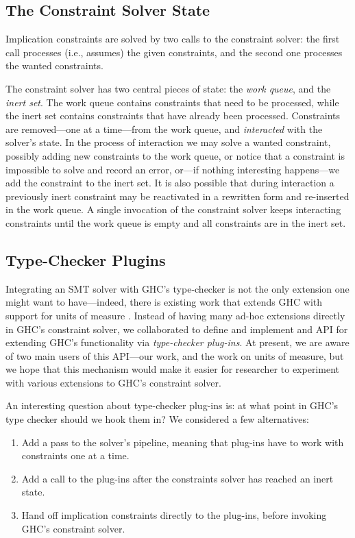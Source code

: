\documentclass{sigplanconf}
\begin{document}
\subsection{The Constraint Solver State}
Implication constraints are solved by two calls to the constraint solver:
the first call processes (i.e., assumes) the given constraints, and the
second one processes the wanted constraints.

The constraint solver has two central pieces of state: the {\em work queue},
and the {\em inert set}.  The work queue contains constraints that need to be
processed, while the inert set contains constraints that have already
been processed.  Constraints are removed---one at a time---from the work queue,
and {\em interacted} with the solver's state.  In the process of interaction
we may solve a wanted constraint, possibly adding new constraints to the
work queue, or notice that a constraint is impossible to solve and record
an error, or---if nothing interesting happens---we add the constraint
to the inert set.  It is also possible that during interaction a previously
inert constraint may be reactivated in a rewritten form and re-inserted
in the work queue.  A single invocation of the constraint solver keeps
interacting constraints until the work queue is empty and all constraints
are in the inert set.

\subsection{Type-Checker Plugins}
Integrating an SMT solver with GHC's type-checker is not the only extension
one might want to have---indeed, there is existing work that extends GHC
with support for units of measure \cite{units-of-measure}.  Instead of
having many ad-hoc extensions directly in GHC's constraint solver, we
collaborated to define and implement and API for extending GHC's functionality
via {\em type-checker plug-ins}.  At present, we are aware of two main
users of this API---our work, and the work on units of measure, but we
hope that this mechanism would make it easier for researcher to experiment
with various extensions to GHC's constraint solver.

An interesting question about type-checker plug-ins is: at what point in
GHC's type checker should we hook them in? We considered a few alternatives:
\begin{enumerate}
\item Add a pass to the solver's pipeline, meaning that plug-ins have to
work with constraints one at a time.
\item Add a call to the plug-ins after the constraints solver has reached
an inert state.
\item Hand off implication constraints directly to the plug-ins,
before invoking GHC's constraint solver.
\end{enumerate}
\end{document}
